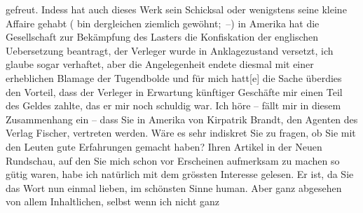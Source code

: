 \begin{ledgroupsized}[t]{13cm}
               gefreut. Indess hat auch dieses Werk sein Schicksal oder wenigstens seine kleine
               Affaire gehabt \introOben{}(\introOben{}\label{T_L02394_1v}\label{T_L02394_1h} bin dergleichen
               ziemlich gewöhnt; –\introOben{})\introOben{} in Amerika hat die Gesellschaft zur Bekämpfung des
                  Lasters die Konfiskation der englischen Uebersetzung beantragt, der Verleger wurde in Anklagezustand
               versetzt, ich glaube sogar verhaftet, aber die Angelegenheit endete diesmal mit einer
               erheblichen Blamage der Tugendbolde und für mich hatt{[}e{]} die Sache
               überdies den Vorteil, dass der Verleger in Erwartung künftiger Geschäfte mir einen Teil des Geldes zahlte,
               das er mir noch schuldig war.\pend
           \pstart
           Ich höre – fällt mir in diesem Zusammenhang ein – dass Sie in Amerika von Kirpatrik {\kaufmannsund} Brandt, den Agenten des Verlag Fischer, vertreten werden. Wäre es sehr indiskret Sie
               zu fragen, ob Sie mit den Leuten gute Erfahrungen gemacht haben?\pend
           \pstart
           Ihren Artikel in der Neuen Rundschau, auf den Sie mich schon vor
               Erscheinen aufmerksam zu machen so gütig waren, habe ich natürlich mit dem grössten
               Interesse gelesen. Er ist, da Sie das Wort nun einmal lieben, im schönsten Sinne
               human. Aber ganz abgesehen von allem Inhaltlichen, selbst wenn ich nicht ganz

\end{ledgroupsized}

